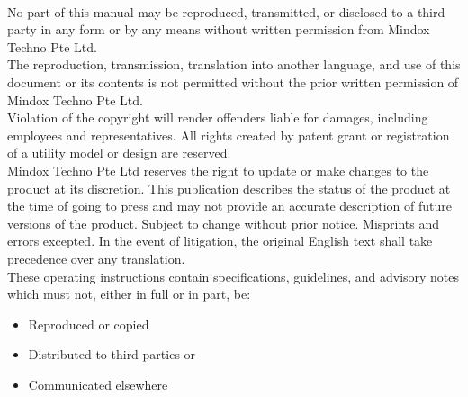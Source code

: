 \newpage

\\
\begin{flushleft}
	\begin{small}
		No part of this manual may be reproduced, transmitted, or disclosed to a third party in any form or by any means without written permission from Mindox Techno Pte Ltd. \\
		
\vspace{0.3cm}
The reproduction, transmission, translation into another language, and use of this document or its contents is not permitted without the prior written permission of Mindox Techno Pte Ltd.\\

\vspace{0.3cm}
Violation of the copyright will render offenders liable for damages, including employees and representatives. All rights created by patent grant or registration of a utility model or design are reserved.\\

\vspace{0.3cm}
Mindox Techno Pte Ltd reserves the right to update or make changes to the product at its discretion. This publication describes the status of the product at the time of going to press and may not provide an accurate description of future versions of the product.	
Subject to change without prior notice. Misprints and errors excepted.
In the event of litigation, the original English text shall take precedence over any translation.\\

\vspace{0.3cm}
These operating instructions contain specifications, guidelines, and advisory notes which must not, either in full or in part, be: 
		\begin{itemize}
			\item Reproduced or copied 
			\item Distributed to third parties or 
			\item Communicated elsewhere
		\end{itemize}
	\end{small}
\end{flushleft}

